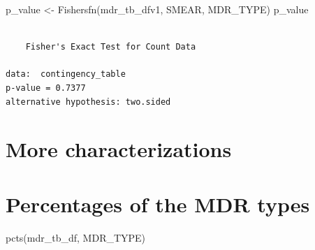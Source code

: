 \documentclass[
]{report}
\newenvironment{Shaded}{\begin{snugshade}}{\end{snugshade}}
\newcommand{\FunctionTok}[1]{\textcolor[rgb]{0.28,0.35,0.67}{#1}}
\newcommand{\NormalTok}[1]{\textcolor[rgb]{0.00,0.23,0.31}{#1}}
\newcommand{\OtherTok}[1]{\textcolor[rgb]{0.00,0.23,0.31}{#1}}
\newcommand{\SpecialCharTok}[1]{\textcolor[rgb]{0.37,0.37,0.37}{#1}}
\newcommand{\StringTok}[1]{\textcolor[rgb]{0.13,0.47,0.30}{#1}}
\begin{document}
\begin{Shaded}
\begin{Highlighting}[]
\NormalTok{p\_value }\OtherTok{\textless{}{-}} \FunctionTok{Fishersfn}\NormalTok{(mdr\_tb\_dfv1, }\StringTok{\textquotesingle{}SMEAR\textquotesingle{}}\NormalTok{, }\StringTok{\textquotesingle{}MDR\_TYPE\textquotesingle{}}\NormalTok{)}
\NormalTok{p\_value}
\end{Highlighting}
\end{Shaded}

\begin{verbatim}

    Fisher's Exact Test for Count Data

data:  contingency_table
p-value = 0.7377
alternative hypothesis: two.sided
\end{verbatim}

\hypertarget{more-characterizations}{%
\chapter{More characterizations}\label{more-characterizations}}

\begin{Shaded}
\end{Shaded}

\hypertarget{percentages-of-the-mdr-types}{%
\chapter{Percentages of the MDR
types}\label{percentages-of-the-mdr-types}}

\begin{Shaded}
\begin{Highlighting}[]
\FunctionTok{pcts}\NormalTok{(mdr\_tb\_df, }\StringTok{\textquotesingle{}MDR\_TYPE\textquotesingle{}}\NormalTok{)}
\end{Highlighting}
\end{Shaded}
\end{document}
